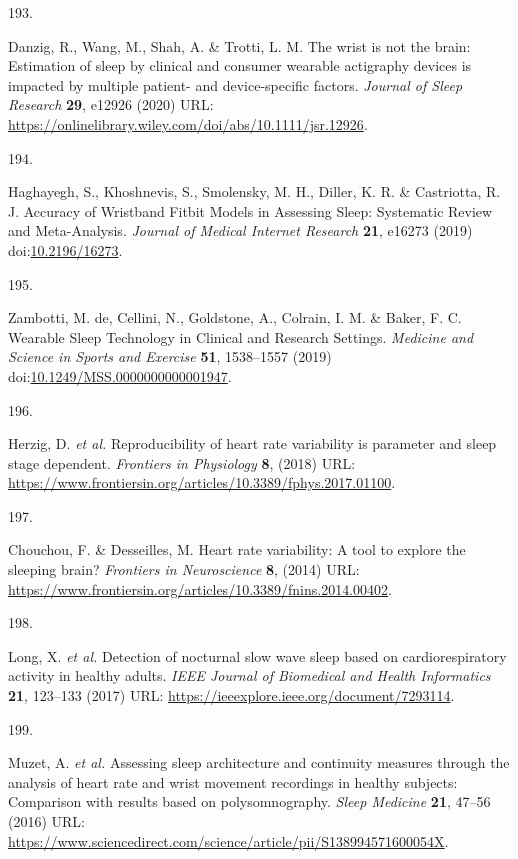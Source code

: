 \documentclass[
  10pt,
]{scrbook}
\newlength{\cslhangindent}
\newlength{\csllabelwidth}
\newlength{\cslentryspacingunit} %
\newenvironment{CSLReferences}[2] %
 {%
  \setlength{\parindent}{0pt}
  \ifodd #1
  \let\oldpar\par
  \def\par{\hangindent=\cslhangindent\oldpar}
  \fi
  \setlength{\parskip}{#2\cslentryspacingunit}
 }%
 {}
\newcommand{\CSLLeftMargin}[1]{\parbox[t]{\csllabelwidth}{#1}}
\newcommand{\CSLRightInline}[1]{\parbox[t]{\linewidth - \csllabelwidth}{#1}\break}
\let\originaltextbf\textbf
\renewcommand{\textbf}[1]{\textcolor{color1}{\textsf{\originaltextbf{#1}}}}
\begin{document}
\begin{CSLReferences}{0}{0}
\leavevmode{}%
\CSLLeftMargin{193. }%
\CSLRightInline{Danzig, R., Wang, M., Shah, A. \& Trotti, L. M. The
wrist is not the brain: Estimation of sleep by clinical and consumer
wearable actigraphy devices is impacted by multiple patient- and
device-specific factors. \emph{Journal of Sleep Research} \textbf{29},
e12926 (2020) URL:
\url{https://onlinelibrary.wiley.com/doi/abs/10.1111/jsr.12926}.}

\leavevmode{}%
\CSLLeftMargin{194. }%
\CSLRightInline{Haghayegh, S., Khoshnevis, S., Smolensky, M. H., Diller,
K. R. \& Castriotta, R. J. Accuracy of Wristband Fitbit Models in
Assessing Sleep: Systematic Review and Meta-Analysis. \emph{Journal of
Medical Internet Research} \textbf{21}, e16273 (2019)
doi:\href{https://doi.org/10.2196/16273}{10.2196/16273}.}

\leavevmode{}%
\CSLLeftMargin{195. }%
\CSLRightInline{Zambotti, M. de, Cellini, N., Goldstone, A., Colrain, I.
M. \& Baker, F. C. Wearable Sleep Technology in Clinical and Research
Settings. \emph{Medicine and Science in Sports and Exercise}
\textbf{51}, 1538--1557 (2019)
doi:\href{https://doi.org/10.1249/MSS.0000000000001947}{10.1249/MSS.0000000000001947}.}

\leavevmode{}%
\CSLLeftMargin{196. }%
\CSLRightInline{Herzig, D. \emph{et al.} Reproducibility of heart rate
variability is parameter and sleep stage dependent. \emph{Frontiers in
Physiology} \textbf{8}, (2018) URL:
\url{https://www.frontiersin.org/articles/10.3389/fphys.2017.01100}.}

\leavevmode{}%
\CSLLeftMargin{197. }%
\CSLRightInline{Chouchou, F. \& Desseilles, M. Heart rate variability: A
tool to explore the sleeping brain? \emph{Frontiers in Neuroscience}
\textbf{8}, (2014) URL:
\url{https://www.frontiersin.org/articles/10.3389/fnins.2014.00402}.}

\leavevmode{}%
\CSLLeftMargin{198. }%
\CSLRightInline{Long, X. \emph{et al.} Detection of nocturnal slow wave
sleep based on cardiorespiratory activity in healthy adults. \emph{IEEE
Journal of Biomedical and Health Informatics} \textbf{21}, 123--133
(2017) URL: \url{https://ieeexplore.ieee.org/document/7293114}.}

\leavevmode{}%
\CSLLeftMargin{199. }%
\CSLRightInline{Muzet, A. \emph{et al.} Assessing sleep architecture and
continuity measures through the analysis of heart rate and wrist
movement recordings in healthy subjects: Comparison with results based
on polysomnography. \emph{Sleep Medicine} \textbf{21}, 47--56 (2016)
URL:
\url{https://www.sciencedirect.com/science/article/pii/S138994571600054X}.}


\end{CSLReferences}
\end{document}
